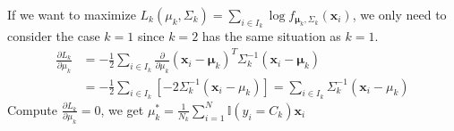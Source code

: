 \documentclass[12pt,a4paper]{article}
\begin{document}
\begin{enumerate}
\begin{enumerate}
                If we want to maximize $L_{k}(\mu_{k},\Sigma_{k}) = \sum_{i\in I_{k}}\log f_{\mathbf{\mu}_{k}, \Sigma_{k}}(\mathbf{x}_{i})$, we only need to consider the case $k = 1$ since $k = 2$ has the same situation as $k = 1$.
                \begin{align*}
                    \frac{\partial L_{k}}{\partial \mu_{k}} 
                        &= - \frac{1}{2}\sum_{i\in I_{k}}\frac{\partial }{\partial \mu_{k}}(\mathbf{x}_{i}-\mathbf{\mu}_{k})^{T}\Sigma_{k}^{-1}(\mathbf{x}_{i}-\mathbf{\mu}_{k}) \\
                        &= - \frac{1}{2} \sum_{i\in I_{k}} [-2\Sigma_{k}^{-1}(\mathbf{x}_{i}-\mu_{k})] = \sum_{i\in I_{k}} \Sigma_{k}^{-1}(\mathbf{x}_{i}-\mu_{k})
                \end{align*}
                Compute $\frac{\partial L_{k}}{\partial \mu_{k}}  = 0 $, we get $\mu_{k}^{*} = \frac{1}{N_{k}}\sum_{i=1}^{N}\mathbb{I} (y_{i}=C_{k})\mathbf{x}_i$


\end{enumerate}
\end{enumerate}
\end{document}
